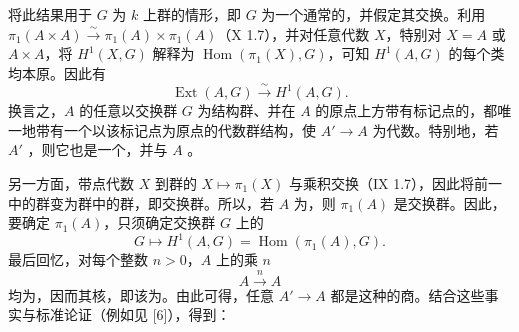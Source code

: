 将此结果用于 $G$ 为 $k$ 上群的情形，即 $G$ 为一个通常的，并假定其交换。利用 $\pi_1(A\times A)\xrightarrow{\sim}\pi_1(A)\times\pi_1(A)$（X 1.7），并对任意代数 $X$，特别对 $X=A$ 或 $A\times A$，将 $H^1(X,G)$ 解释为 $\operatorname{Hom}(\pi_1(X),G)$，可知 $H^1(A,G)$ 的每个类均本原。因此有
\[
\operatorname{Ext}(A,G)\xrightarrow{\sim}H^1(A,G).
\]
换言之，$A$ 的任意以交换群 $G$ 为结构群、并在 $A$ 的原点上方带有标记点的，都唯一地带有一个以该标记点为原点的代数群结构，使 $A'\to A$ 为代数。特别地，若 $A'$ ，则它也是一个，并与 $A$ 。

另一方面，带点代数 $X$ 到群的 $X\mapsto\pi_1(X)$ 与乘积交换（IX 1.7），因此将前一中的群变为群中的群，即交换群。所以，若 $A$ 为，则 $\pi_1(A)$ 是交换群。因此，要确定 $\pi_1(A)$，只须确定交换群 $G$ 上的
\[
G\longmapsto H^1(A,G)=\operatorname{Hom}(\pi_1(A),G).
\]
最后回忆，对每个整数 $n>0$，$A$ 上的乘 $n$ 
\[
A\xrightarrow{n}A
\]
均为，因而其核，即该为。由此可得，任意 $A'\to A$ 都是这种的商。结合这些事实与标准论证（例如见 [6]），得到：

